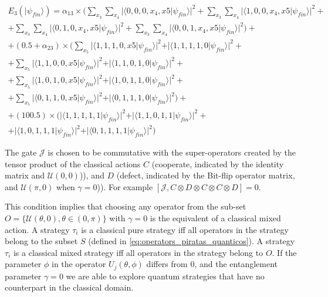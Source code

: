 \begin{equation}
\begin{split}
E_{3}(\vert\psi_{fin}\rangle)=\alpha_{13}\times(\sum_{x_{3}}\sum_{x_{4}}\vert\langle0,0,0,x_{4},x{5}\vert\psi_{fin}\rangle\vert^{2} + \sum_{x_{3}}\sum_{x_{4}}\vert\langle1,0,0,x_{4},x{5}\vert\psi_{fin}\rangle\vert^{2} + \\ 
+ \sum_{x_{3}}\sum_{x_{4}}\vert\langle0,1,0,x_{4},x{5}\vert\psi_{fin}\rangle\vert^{2}
+ \sum_{x_{3}}\sum_{x_{4}}\vert\langle0,0,1,x_{4},x{5}\vert\psi_{fin}\rangle\vert^{2}
 ) + \\
 + (0.5 + \alpha_{23})\times(\sum_{x_{5}}\vert\langle1,1,1,0,x{5}\vert\psi_{fin}\rangle\vert^{2} + \vert\langle1,1,1,1,0\vert\psi_{fin}\rangle\vert^{2} + \\ + \sum_{x_{5}}\vert\langle1,1,0,0,x{5}\vert\psi_{fin}\rangle\vert^{2}+ \vert\langle1,1,0,1,0\vert\psi_{fin}\rangle\vert^{2} + \\ 
+ \sum_{x_{5}}\vert\langle1,0,1,0,x{5}\vert\psi_{fin}\rangle\vert^{2} + \vert\langle1,0,1,1,0\vert\psi_{fin}\rangle\vert^{2}
+ \\ + \sum_{x_{5}}\vert\langle0,1,1,0,x{5}\vert\psi_{fin}\rangle\vert^{2} + \vert\langle0,1,1,1,0\vert\psi_{fin}\rangle\vert^{2}
 )  + \\
 + (100.5)\times(\vert\langle1,1,1,1,1\vert\psi_{fin}\rangle\vert^{2} + \vert\langle1,1,0,1,1\vert\psi_{fin}\rangle\vert^{2} + \\ 
+ \vert\langle1,0,1,1,1\vert\psi_{fin}\rangle\vert^{2}
+ \vert\langle0,1,1,1,1\vert\psi_{fin}\rangle\vert^{2}
 )
\end{split}
\label{eq:pirates_payoff32:3}
\end{equation}



The gate $\mathcal{J}$ is chosen to be commutative with the super-operators created by the tensor product of the classical actions $C$ (cooperate, indicated by the identity matrix and $\mathcal{U}(0,0)$)), and $D$ (defect, indicated by the Bit-flip operator matrix, and $\mathcal{U}(\pi,0)$ when $\gamma = 0$)). For example $[ \mathcal{J} , C \otimes D \otimes C \otimes C \otimes D ] = 0 $.


This condition implies that choosing any operator from the sub-set $O = \{ \mathcal{U} ( \theta , 0) , \theta \in (0, \pi) \}$ with $\gamma = 0$ is the equivalent of a classical mixed action. A strategy $\tau_{i}$ is a classical pure strategy iff all operators in the strategy belong to the subset $S$ (defined in \ref{eq:operators_piratas_quanticos}). A strategy $\tau_{i}$ is a classical mixed strategy iff all operators in the strategy belong to $O$.
If the parameter $\phi$ in the operator $U_{j}(\theta ,\phi)$ differs from $0$, and the entanglement parameter $\gamma = 0$ we are able to explore quantum strategies that have no counterpart in the classical domain\cite{Eisert2008}.










